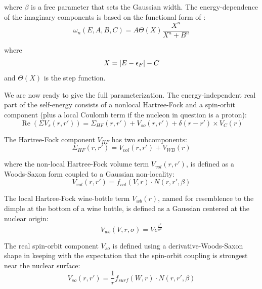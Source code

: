 \noindent
where $\beta$ is a free parameter that sets the Gaussian width. The energy-dependence of the
imaginary components is based on the functional form of \cite{Charity2006}:
\begin{equation}
    \omega_{n}(E, A, B, C) = A\Theta(X)\frac{X^{n}}{X^{n}+B^{n}}
\end{equation}

\noindent
where
\begin{equation*}
    X = |E-\epsilon_{F}|-C\\
\end{equation*}
\noindent
and $\Theta(X)$ is the step function. 

We are now ready to give the full parameterization.  
The energy-independent real part of the self-energy consists of a nonlocal Hartree-Fock and
a spin-orbit component (plus a local Coulomb term if the nucleon in question is a proton):
\begin{equation}
    \operatorname{Re}({\Sigma}V_{s}(r,r')) = \Sigma_{HF}(r,r')+V_{so}(r,r')+\delta(r-r')\times V_{C}(r)
\end{equation}

\noindent
The Hartree-Fock component $V_{HF}$ has two subcomponents:
\begin{equation}
    \Sigma_{HF}(r,r') = V_{vol}(r,r') + V_{WB}(r)
\end{equation}

\noindent
where the non-local Hartree-Fock volume term $V_{vol}(r,r')$, is defined as
a Woods-Saxon form coupled to a Gaussian non-locality:
\begin{equation}
    V_{vol}(r,r') = f_{vol}(V,r){\cdot}N(r,r',\beta)
\end{equation}

The local Hartree-Fock wine-bottle
term $V_{wb}(r)$, named for resemblence to the dimple at the bottom of a wine
bottle, is defined as a Gaussian centered at the nuclear origin:
\begin{equation}
    V_{wb}(V, r,\sigma) = Ve^{\frac{r^{2}}{\sigma^{2}}}
\end{equation}

\noindent
The real spin-orbit component $V_{so}$
is defined using a derivative-Woods-Saxon shape in keeping with the
expectation that the spin-orbit coupling is strongest near the
nuclear surface:
\begin{equation}
    V_{so}(r,r') =
    \frac{1}{r}f_{surf}(W,r){\cdot}N(r,r',\beta)
\end{equation}


